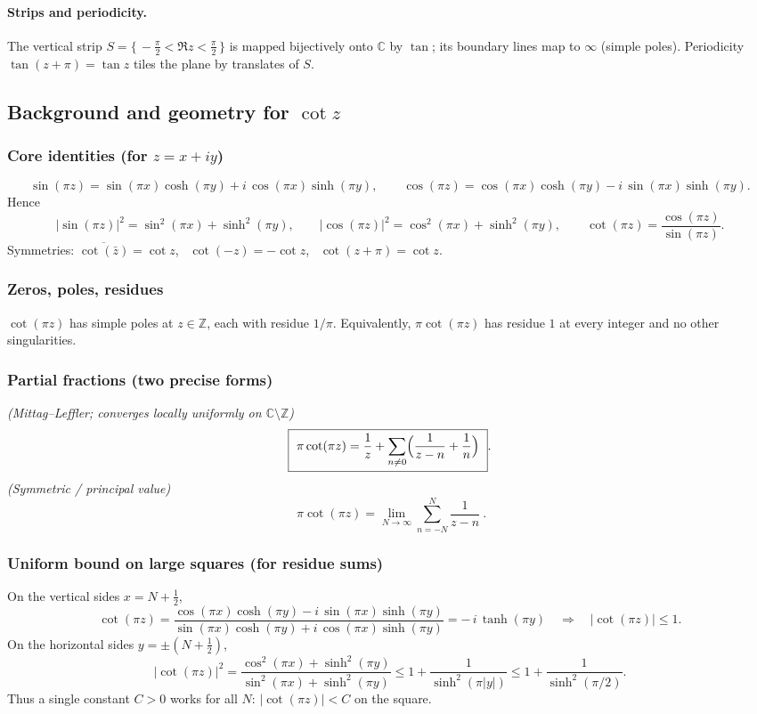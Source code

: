 \documentclass[11pt,a4paper]{article}
\theoremstyle{definition}
\theoremstyle{definition}
\theoremstyle{plain}
\theoremstyle{remark}
\begin{document}
\medskip
\paragraph{Strips and periodicity.}
The vertical strip $S=\{\, -\tfrac{\pi}{2}<\Re z<\tfrac{\pi}{2}\,\}$ is mapped bijectively onto $\mathbb C$ by $\tan$; its boundary lines map to $\infty$ (simple poles). Periodicity $\tan(z+\pi)=\tan z$ tiles the plane by translates of $S$.


\subsection*{Background and geometry for $\cot z$}

\subsubsection*{Core identities (for $z=x+iy$)}
\[
\sin(\pi z)=\sin(\pi x)\cosh(\pi y)+i\,\cos(\pi x)\sinh(\pi y),\qquad
\cos(\pi z)=\cos(\pi x)\cosh(\pi y)-i\,\sin(\pi x)\sinh(\pi y).
\]
Hence
\[
|\sin(\pi z)|^{2}=\sin^{2}(\pi x)+\sinh^{2}(\pi y),\qquad
|\cos(\pi z)|^{2}=\cos^{2}(\pi x)+\sinh^{2}(\pi y),\qquad
\cot(\pi z)=\frac{\cos(\pi z)}{\sin(\pi z)}.
\]
Symmetries: $\overline{\cot(\bar z)}=\cot z$, \ $\cot(-z)=-\cot z$, \ $\cot(z+\pi)=\cot z$.

\medskip
\subsubsection*{Zeros, poles, residues}
$\cot(\pi z)$ has simple poles at $z\in\mathbb{Z}$, each with residue $1/\pi$.
Equivalently, $\pi\cot(\pi z)$ has residue $1$ at every integer and no other singularities.

\medskip
\subsubsection*{Partial fractions (two precise forms)}
\emph{(Mittag--Leffler; converges locally uniformly on $\mathbb{C}\setminus\mathbb{Z}$)}
\[
\boxed{\ \pi\cot(\pi z)=\frac{1}{z}+\sum_{n\neq 0}\Bigl(\frac{1}{z-n}+\frac{1}{n}\Bigr)\ }.
\]
\emph{(Symmetric / principal value)}
\[
\boxed{\ \pi\cot(\pi z)=\lim_{N\to\infty}\sum_{n=-N}^{N}\frac{1}{z-n}\ }.
\]

\medskip
\subsubsection*{Uniform bound on large squares (for residue sums)}
On the vertical sides $x=N+\tfrac12$,
\[
\cot(\pi z)=\frac{\cos(\pi x)\cosh(\pi y)-i\,\sin(\pi x)\sinh(\pi y)}%
{\sin(\pi x)\cosh(\pi y)+i\,\cos(\pi x)\sinh(\pi y)}
=-\,i\,\tanh(\pi y)\quad\Rightarrow\quad |\cot(\pi z)|\le 1.
\]
On the horizontal sides $y=\pm(N+\tfrac12)$,
\[
|\cot(\pi z)|^{2}
=\frac{\cos^{2}(\pi x)+\sinh^{2}(\pi y)}{\sin^{2}(\pi x)+\sinh^{2}(\pi y)}
\le 1+\frac{1}{\sinh^{2}(\pi|y|)}
\le 1+\frac{1}{\sinh^{2}(\pi/2)}.
\]
Thus a single constant $C>0$ works for all $N$: $|\cot(\pi z)|<C$ on the square.
\end{document}
